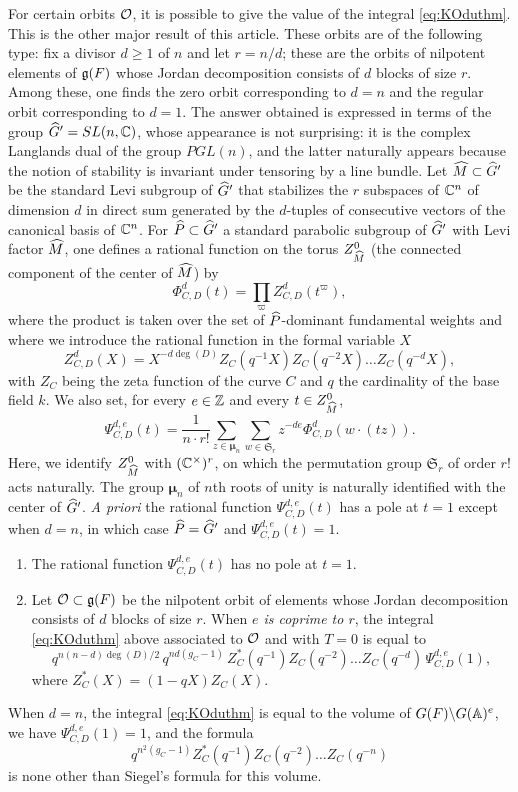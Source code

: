 \begin{paragr}
For certain orbits $\mathcal{O}$, it is possible to give the value of the integral \eqref{eq:KOduthm}. This is the other major result of this article. These orbits are of the following type: fix a divisor $d\geq 1$ of $n$ and let $r=n/d$; these are the orbits of nilpotent elements of $\mathfrak{g}(F)$ whose Jordan decomposition consists of $d$ blocks of size $r$. Among these, one finds the zero orbit corresponding to $d=n$ and the regular orbit corresponding to $d=1$. The answer obtained is expressed in terms of the group $\widehat{G}'=SL(n,\mathbb{C})$, whose appearance is not surprising: it is the complex Langlands dual of the group $PGL(n)$, and the latter naturally appears because the notion of stability is invariant under tensoring by a line bundle. Let $\widehat{M}\subset \widehat{G}'$ be the \og standard\fg{} Levi subgroup of $\widehat{G}'$ that stabilizes the $r$ subspaces of $\mathbb{C}^n$ of dimension $d$ in direct sum generated by the $d$-tuples of \og consecutive\fg{} vectors of the canonical basis of $\mathbb{C}^n$. For $\widehat{P}\subset \widehat{G}'$ a standard parabolic subgroup of $\widehat{G}'$ with Levi factor $\widehat{M}$, one defines a rational function on the torus $Z_{\widehat{M}}^0$ (the connected component of the center of $\widehat{M}$) by
$$\Phi_{C,D}^d(t)=\prod_{\varpi } Z_{C,D}^d(t^{\varpi}),$$
where the product is taken over the set of $\widehat{P}$-dominant fundamental weights and where we introduce the rational function in the formal variable $X$
$$Z_{C,D}^d(X)=X^{-d\deg(D)}Z_C(q^{-1}X)Z_C(q^{-2}X)\ldots Z_C(q^{-d}X),$$
with $Z_C$ being the zeta function of the curve $C$ and $q$ the cardinality of the base field $k$. We also set, for every $e\in \mathbb{Z}$ and every $t\in Z_{\widehat{M}}^0$,
$$\Psi_{C,D}^{d,e}(t)=\frac{1}{n\cdot r!} \sum_{z\in \mathbf{\mu}_n} \sum_{w\in \mathfrak{S}_r}z^{-de}  \Phi_{C,D}^d( w\cdot( t z)).$$
Here, we identify $Z_{\widehat{M}}^0$ with $(\mathbb{C}^\times)^r$, on which the permutation group $\mathfrak{S}_r$ of order $r!$ acts naturally. The group $\mathbf{\mu}_n$ of $n$th roots of unity is naturally identified with the center of $\widehat{G}'$. \emph{A priori} the rational function $\Psi_{C,D}^{d,e}(t)$ has a pole at $t=1$ except when $d=n$, in which case $\widehat{P}=\widehat{G}'$ and $\Psi_{C,D}^{d,e}(t)=1$.

\begin{theoreme}\label{thm:intro-calcul}
  \begin{enumerate}
  \item The rational function $\Psi_{C,D}^{d,e}(t)$ has no pole at $t=1$.
  \item Let $\mathcal{O}\subset \mathfrak{g}(F)$ be the nilpotent orbit of elements whose Jordan decomposition consists of $d$ blocks of size $r$. When \emph{$e$ is coprime to $r$}, the integral \eqref{eq:KOduthm} above associated to $\mathcal{O}$ and with $T=0$ is equal to 
$$q^{n(n-d)\deg(D)/2} \, q^{nd(g_C-1)}\, Z_C^*(q^{-1})Z_C(q^{-2})\ldots Z_C(q^{-d}) \, \Psi_{C,D}^{d,e}(1),$$
where $Z_C^*(X)=(1-qX) Z_C(X)$.
  \end{enumerate}
\end{theoreme}
When $d=n$, the integral \eqref{eq:KOduthm} is equal to the volume of $G(F)\backslash G(\mathbb{A})^e$, we have $\Psi_{C,D}^{d,e}(1)=1$, and the formula
$$ q^{n^2(g_C-1)} Z_C^*(q^{-1})Z_C(q^{-2})\ldots Z_C(q^{-n})$$
is none other than Siegel's formula for this volume.
\end{paragr}
